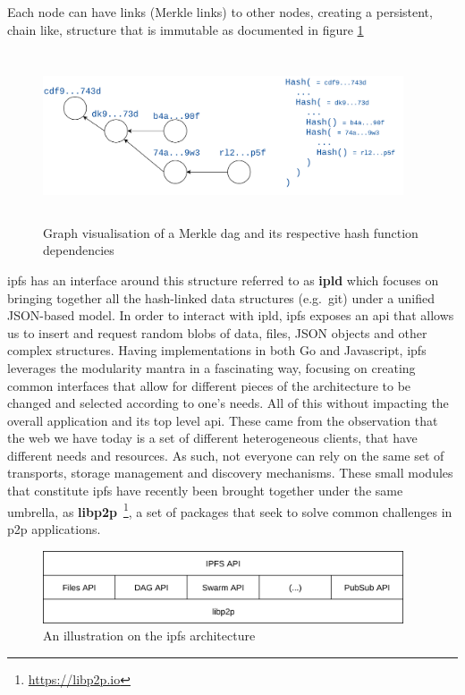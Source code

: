Each node can have links (Merkle links) to other nodes, creating a persistent,
chain like, structure that is immutable as documented in figure
\ref{fig:merkle-dag}

\begin{figure}[hb!]
  \centering
  \includegraphics[max height=5cm,max width=0.95\textwidth]{img/merkle-dag.png}
  \caption{Graph visualisation of a Merkle \acrshort{dag} and its respective hash function dependencies}
  \label{fig:merkle-dag}
\end{figure}

\acrshort{ipfs} has an interface around this structure referred to as
\textbf{\acrfull{ipld}} which focuses on bringing together all the hash-linked
data structures (e.g.~git) under a unified JSON-based model. In order to
interact with \acrshort{ipld}, \acrshort{ipfs} exposes an \acrshort{api} that
allows us to insert and request random blobs of data, files, JSON objects and
other complex structures. Having implementations in both Go and Javascript,
\acrshort{ipfs} leverages the modularity mantra in a fascinating way, focusing
on creating common interfaces that allow for different pieces of the
architecture to be changed and selected according to one's needs.  All of this
without impacting the overall application and its top level \acrshort{api}.
These came from the observation that the web we have today is a set of
different heterogeneous clients, that have different needs and resources. As
such, not everyone can rely on the same set of transports, storage management
and discovery mechanisms. These small modules that constitute \acrshort{ipfs}
have recently been brought together under the same umbrella, as
\textbf{libp2p}~\footnote{\url{https://libp2p.io}}, a set of packages that seek to
solve common challenges in \acrshort{p2p} applications. 

\begin{figure}[hb!]
  \centering
  \includegraphics[width=0.95\textwidth]{img/ipfs-stack.png}
  \caption{An illustration on the \acrshort{ipfs} architecture}
  \label{fig:ipfs-stack}
\end{figure}

